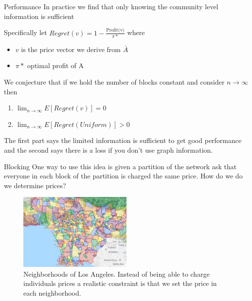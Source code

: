 \documentclass[11pt]{beamer}
\newcommand\<{\langle}
\renewcommand\>{\rangle}
\begin{document}
\begin{frame}{Performance}
  In practice we find that only knowing the community level information is sufficient

  Specifically let $Regret(v) = 1 - \frac{\text{Profit(v)}}{\pi*}$
  where
  \begin{itemize}
    \item $v$ is the price vector we derive from $\bar{A}$
    \item $\pi*$ optimal profit of A
  \end{itemize}
  \pause
  We conjecture that if we hold the number of blocks constant and consider $n \to \infty$ then \\
  \begin{enumerate}
    \item  $\lim_{n \to \infty} E[Regret(v)] = 0$
    \item $\lim_{n\to \infty} E[Regret(Uniform)] > 0$ \\
  \end{enumerate}
  \pause
  The first part says the limited information is sufficient to get good performance and the second says there is a loss if you don't use graph information.

\end{frame}

\begin{frame}{Blocking}
  One way to use this idea is given a partition of the network ask that everyone in each block of the partition is charged the same price. How do we  do we determine prices?

  \begin{figure}
    \includegraphics[width=0.5\textwidth]{images/city.jpg}
    \caption{Neighborhoods of Los Angeles. Instead of being able to charge individuals prices a realistic constraint is that we set the price in each neighborhood.}
    \label{fig:3}
  \end{figure}

\end{frame}
\end{document}
